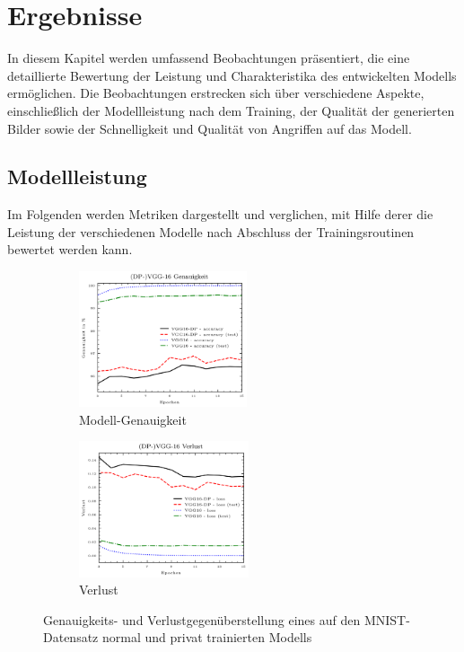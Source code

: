 \chapter{Ergebnisse} \label{chpt:Ergebnisse_Main}
In diesem Kapitel werden umfassend Beobachtungen präsentiert, die eine detaillierte Bewertung der Leistung und Charakteristika des entwickelten Modells ermöglichen. Die Beobachtungen erstrecken sich über verschiedene Aspekte, einschließlich der Modellleistung nach dem Training, der Qualität der generierten Bilder sowie der Schnelligkeit und Qualität von Angriffen auf das Modell.
\section{Modellleistung}
Im Folgenden werden Metriken dargestellt und verglichen, mit Hilfe derer die Leistung der verschiedenen Modelle nach Abschluss der Trainingsroutinen bewertet werden kann.
\begin{figure}[H]
	\centering
	\begin{subfigure}[b]{0.35\linewidth}
		\includegraphics[width=\linewidth, height=4cm]{Bilder/acc.png}
		\caption{Modell-Genauigkeit}
		\label{img:acc_vgg_dp}
	\end{subfigure}
	\hspace{1cm} %
	\begin{subfigure}[b]{0.35\linewidth}
		\includegraphics[width=\linewidth, height=4cm]{Bilder/loss.png}
		\caption{Verlust}
		\label{img:loss_vgg_dp}
	\end{subfigure}
	\caption{Genauigkeits- und Verlustgegenüberstellung eines auf den MNIST-Datensatz normal und privat trainierten Modells}
	\label{img:mnist_figure}
\end{figure}

